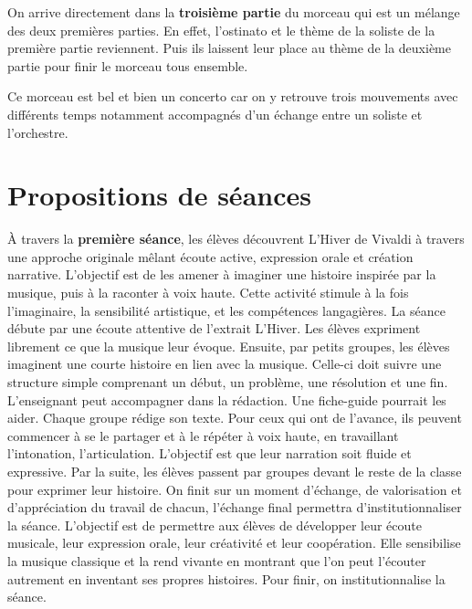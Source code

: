 \documentclass[12pt]{article}
\begin{document}
On arrive directement dans la \textbf{troisième partie} du morceau qui est un mélange des deux premières parties. En effet, l’ostinato et le thème de la soliste de la première partie reviennent. Puis ils laissent leur place au thème de la deuxième partie pour finir le morceau tous ensemble.

Ce morceau est bel et bien un concerto car on y retrouve trois mouvements avec différents temps notamment accompagnés d’un échange entre un soliste et l’orchestre.



\section{Propositions de séances}

À travers la \textbf{première séance}, les élèves découvrent L’Hiver de Vivaldi à travers une approche originale mêlant écoute active, expression orale et création narrative. L’objectif est de les amener à imaginer une histoire inspirée par la musique, puis à la raconter à voix haute. Cette activité stimule à la fois l’imaginaire, la sensibilité artistique, et les compétences langagières. 
La séance débute par une écoute attentive de l’extrait L’Hiver. Les élèves expriment librement ce que la musique leur évoque. Ensuite, par petits groupes, les élèves imaginent une courte histoire en lien avec la musique. Celle-ci doit suivre une structure simple comprenant un début, un problème, une résolution et une fin. L’enseignant peut accompagner dans la rédaction. Une fiche-guide pourrait les aider. Chaque groupe rédige son texte. Pour ceux qui ont de l’avance, ils peuvent commencer à se le partager et à le répéter à voix haute, en travaillant l’intonation, l’articulation. L’objectif est que leur narration soit fluide et expressive. Par la suite, les élèves passent par groupes devant le reste de la classe pour exprimer leur histoire. On finit sur un moment d’échange, de valorisation et d’appréciation du travail de chacun, l’échange final permettra d’institutionnaliser la séance. L’objectif est de permettre aux élèves de développer leur écoute musicale, leur expression orale, leur créativité et leur coopération. Elle sensibilise la musique classique et la rend vivante en montrant que l’on peut l’écouter autrement en inventant ses propres histoires. Pour finir, on institutionnalise la séance.
\end{document}
